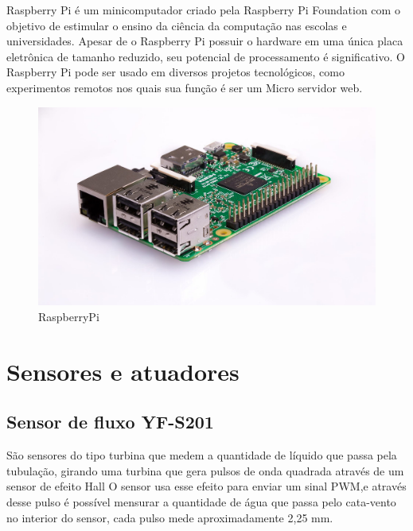Raspberry Pi é um minicomputador criado pela
Raspberry Pi Foundation com o objetivo de estimular o
ensino da ciência da computação nas escolas e
universidades. Apesar de o Raspberry Pi possuir o
hardware em uma única placa eletrônica de tamanho
reduzido, seu potencial de processamento é significativo.
O Raspberry Pi pode ser usado em diversos projetos
tecnológicos, como experimentos remotos nos quais sua
função é ser um Micro servidor web.\cite{crotti2013raspberrypi}

\begin{figure}[htbp]
		\centering
		\includegraphics[scale=0.2]{figuras/raspberrypi.jpg}
		\caption{RaspberryPi}
		\label{fig:09}
\end{figure}

\section{Sensores e atuadores}

\subsection{Sensor de fluxo YF-S201}

São sensores do tipo turbina que medem a quantidade de líquido que passa pela tubulação, girando uma turbina que
gera pulsos de onda quadrada através de um sensor de efeito Hall\cite{roque2018sistema} O
sensor usa esse efeito para enviar um sinal PWM,e através desse pulso é possível mensurar a quantidade de água que passa pelo cata-vento no interior do sensor, cada pulso mede aproximadamente 2,25 mm.\cite{ms2017automaccao}

